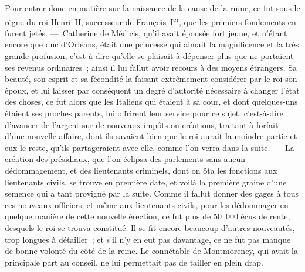 \documentclass[french,twoside]{book} %
\begin{document}
Pour entrer donc en matière sur la naissance de la cause de la ruine, ce fut sous le règne du roi Henri II, successeur de François I\textsuperscript{er}, que les premiers fondements en furent jetés. — Catherine de Médicis, qu’il avait épousée fort jeune, et n’étant encore que duc d’Orléans, était une princesse qui aimait la magnificence et la très grande profusion, c’est-à-dire qu’elle se plaisait à dépenser plus que ne portaient ses revenus ordinaires ; ainsi il lui fallut avoir recours à des moyens étrangers. Sa beauté, son esprit et sa fécondité la faisant extrêmement considérer par le roi son époux, et lui laisser par conséquent un degré d’autorité nécessaire à changer l’état des choses, ce fut alors que les Italiens qui étaient à sa cour, et dont quelques-uns étaient ses proches parents, lui offrirent leur service pour ce sujet, c’est-à-dire d’avancer de l’argent sur de nouveaux impôts ou créations, traitant à forfait d’une nouvelle affaire, dont ils savaient bien que le roi aurait la moindre partie et eux le reste, qu’ils partageraient avec elle, comme l’on verra dans la suite. — La création des présidiaux, que l’on éclipsa des parlements sans aucun dédommagement, et des lieutenants criminels, dont on ôta les fonctions aux lieutenants civils, se trouve en première date, et voilà la première graine d’une semence qui a tant provigné par la suite. Comme il fallut donner des gages à tous ces nouveaux officiers, et même aux lieutenants civils, pour les dédommager en quelque manière de cette nouvelle érection, ce fut plus de 50 000 écus de rente, desquels le roi se trouva constitué. Il se fit encore beaucoup d’autres nouveautés, trop longues à détailler ; et s’il n’y en eut pas davantage, ce ne fut pas manque de bonne volonté du côté de la reine. Le connétable de Montmorency, qui avait la principale part au conseil, ne lui permettait pas de tailler en plein drap.\par
\end{document}
